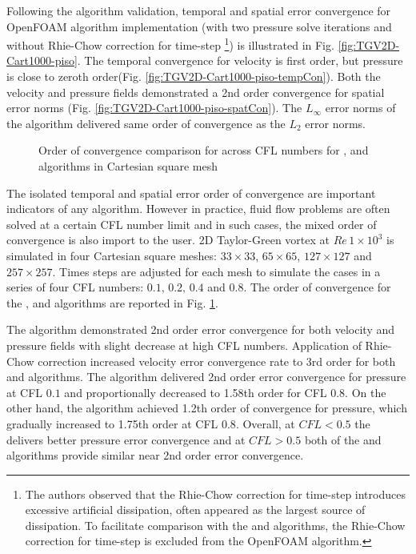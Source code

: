 Following the \spaeceRC algorithm validation, temporal and spatial error convergence for OpenFOAM \piso algorithm implementation (with two pressure solve iterations and without Rhie-Chow correction for time-step \footnote{The authors observed that the Rhie-Chow correction for time-step introduces excessive artificial dissipation, often appeared as the largest source of dissipation. To facilitate comparison with the \spaeceRC and \spaeceARC algorithms, the  Rhie-Chow correction for time-step is excluded from the OpenFOAM \piso algorithm.}) is illustrated in Fig. \ref{fig:TGV2D-Cart1000-piso}. The temporal convergence for velocity is first order, but pressure is close to zeroth order(Fig. \ref{fig:TGV2D-Cart1000-piso-tempCon}). Both the velocity and pressure fields demonstrated a 2nd order convergence for spatial error norms (Fig. \ref{fig:TGV2D-Cart1000-piso-spatCon}). The $L_\infty$ error norms of the \piso algorithm delivered same order of convergence as the $L_2$ error norms.

\begin{figure}[!ht]
\centering
{}
\caption{Order of convergence comparison for across CFL numbers for \spaece, \spaeceRC and \piso algorithms in Cartesian square mesh} 
\label{fig:TGV2D-Cart1000-CFL}
\end{figure}

The isolated temporal and spatial error order of convergence are important indicators of any algorithm. However in practice, fluid flow problems are often solved at a certain CFL number\cite{courant1928, courant1967} limit and in such cases, the mixed order of convergence is also import to the user. 2D Taylor-Green vortex at $Re\, 1\times10^3$ is simulated in four Cartesian square meshes: $33 \times 33$, $65 \times 65$, $127 \times 127$ and $257 \times 257$. Times steps are adjusted for each mesh to simulate the cases in a series of four CFL numbers: $0.1, \, 0.2,\, 0.4$ and $0.8$. The order of convergence for the \spaece, \spaeceRC and \piso algorithms are reported in Fig. \ref{fig:TGV2D-Cart1000-CFL}. 

The \spaece algorithm demonstrated 2nd order error convergence for both velocity and pressure fields with slight decrease at high CFL numbers. Application of  Rhie-Chow correction increased velocity error convergence rate to 3rd order for both \spaeceRC and \piso algorithms. The \spaeceRC algorithm delivered 2nd order error convergence for pressure at CFL $0.1$ and proportionally decreased to 1.58th order for CFL $0.8$. On the other hand, the \piso algorithm achieved 1.2th order of convergence for pressure, which gradually increased to 1.75th order at CFL $0.8$. 
Overall, at $CFL < 0.5 $ the \spaeceRC delivers better pressure error convergence and at $CFL > 0.5$ both of the \spaeceRC and \piso algorithms provide similar near 2nd order error convergence.


